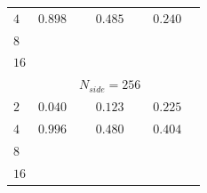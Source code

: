 \begin{table}
\begin{tabular}{@{}lcccc}
$4$ & $ 0.898 $ & $ 0.485 $ & $ 0.240 $  \\
$8$ & $ $ & $  $ & $  $  \\
$16$ & $  $ & $  $ & $  $  \\
 & & $N_{side} = 256$ & \\
$2$ & $ 0.040 $ & $ 0.123 $ & $ 0.225 $ \\ 
$4$ & $ 0.996 $ & $ 0.480 $ & $ 0.404 $  \\
$8$ & $  $ & $  $ & $  $  \\
$16$ & $ $ & $  $ & $  $  \\
\hline
\end{tabular} 
\end{table}

